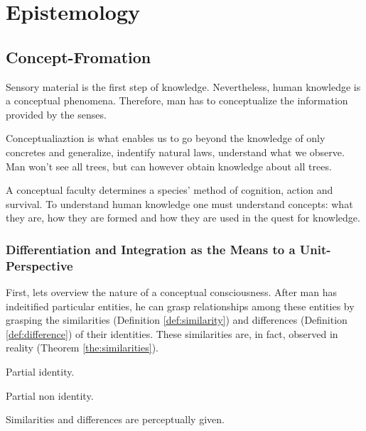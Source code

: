 \part{Epistemology}
\label{part:epistemology}

\chapter{Concept-Fromation}

    Sensory material is the first step of knowledge. Nevertheless, human knowledge is a conceptual phenomena. Therefore, man has to conceptualize the information provided by the senses.

    Conceptualiaztion is what enables us to go beyond the knowledge of only concretes and generalize, indentify natural laws, understand what we observe. Man won't see all trees, but can however obtain knowledge about all trees.

    A conceptual faculty determines a species' method of cognition, action and survival. To understand human knowledge one must understand concepts: what they are, how they are formed and how they are used in the quest for knowledge.

    \section{Differentiation and Integration as the Means to a Unit-Perspective}

        First, lets overview the nature of a conceptual consciousness. After man has indeitified particular entities, he can grasp relationships among these entities by grasping the similarities (Definition \ref{def:similarity}) and differences (Definition \ref{def:difference}) of their identities. These similarities are, in fact, observed in reality (Theorem \ref{the:similarities}).

            \begin{definition}[Similarity]
            \label{def:similarity}
                Partial identity.
            \end{definition}

            \begin{definition}[Difference]
            \label{def:difference}
                Partial non identity.
            \end{definition}

            \begin{theorem}
            \label{the:similarities}
                Similarities and differences are perceptually given.
            \end{theorem}

